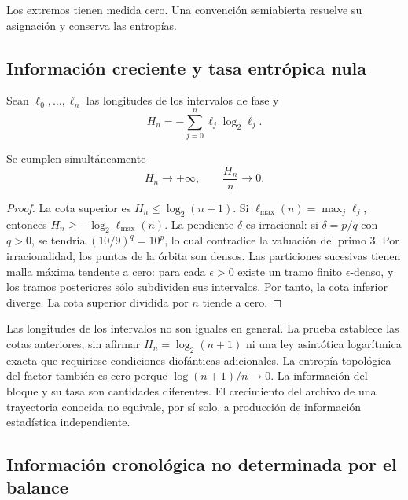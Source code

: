 Los extremos tienen medida cero. Una convención semiabierta resuelve su
asignación y conserva las entropías.

\subsection{Información creciente y tasa entrópica nula}
\label{md:cron:crecimiento}

Sean $\ell_0,\ldots,\ell_n$ las longitudes de los intervalos de fase y
\begin{equation}
 H_n=-\sum_{j=0}^{n}\ell_j\log_2\ell_j.
 \label{md:cron:entropia-bloque}
\end{equation}

\begin{proposition}
\label{md:cron:proposicion-tasa}
Se cumplen simultáneamente
\begin{equation}
 H_n\longrightarrow+\infty,\qquad
 \frac{H_n}{n}\longrightarrow0.
 \label{md:cron:dos-limites}
\end{equation}
\end{proposition}
\begin{proof}
La cota superior es $H_n\leq\log_2(n+1)$. Si
$\ell_{\max}(n)=\max_j\ell_j$, entonces
$H_n\geq-\log_2\ell_{\max}(n)$.
La pendiente $\delta$ es irracional: si $\delta=p/q$ con $q>0$,
se tendría $(10/9)^q=10^p$, lo cual contradice la valuación del primo $3$.
Por irracionalidad, los puntos de la órbita son densos. Las particiones
sucesivas tienen malla máxima tendente a cero: para cada $\epsilon>0$
existe un tramo finito $\epsilon$-denso, y los tramos posteriores sólo
subdividen sus intervalos. Por tanto, la cota inferior diverge. La cota
superior dividida por $n$ tiende a cero.
\end{proof}

Las longitudes de los intervalos no son iguales en general. La prueba
establece las cotas anteriores, sin afirmar
$H_n=\log_2(n+1)$ ni una ley asintótica logarítmica exacta que requiriese
condiciones diofánticas adicionales.
La entropía topológica del factor también es cero porque
$\log(n+1)/n\to0$. La información del bloque y su tasa son cantidades
diferentes. El crecimiento del archivo de una trayectoria conocida no
equivale, por sí solo, a producción de información estadística independiente.

\subsection{Información cronológica no determinada por el balance}
\label{md:cron:condicional}

